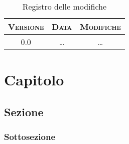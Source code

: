 \documentclass[10pt,a4paper,hidelinks,draft]{scrreprt} %
\begin{document}
    \title{\rmfamily\normalfont{}}
    \author{}
    \date{\today}
    
    \maketitle
    
    \begin{abstract}
        \noindent Breve descrizione del documento.
    \end{abstract}
    
	\begin{table}[ht]
	\centering
	\begin{tabular}{|c|c|c|}
	\hline
	\textsc{Versione} & \textsc{Data} & \textsc{Modifiche} \\ \hline
	0.0 & \ldots & \ldots \\ \hline
	\end{tabular}
	\caption{Registro delle modifiche}
	\label{tab:stage:wp:workload}
	\end{table}

	\tableofcontents

	\chapter{Capitolo}
	\section{Sezione}
	\subsection{Sottosezione}
\end{document}
